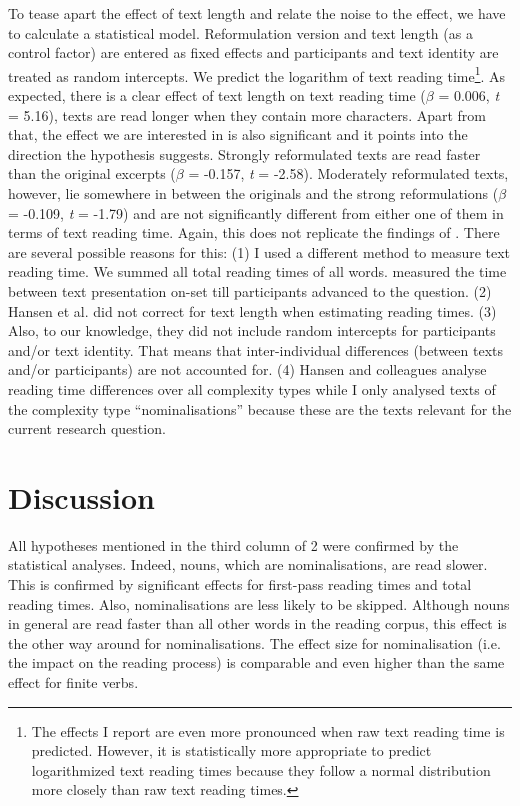 \documentclass[output=paper]{langsci/langscibook}
\begin{document}
To tease apart the effect of text length and relate the noise to the effect, we have to calculate a statistical model. Reformulation version and text length (as a control factor) are entered as fixed effects and participants and text identity are treated as random intercepts. We predict the logarithm of text reading time\footnote{The effects I report are even more pronounced when raw text reading time is predicted. However, it is statistically more appropriate to predict logarithmized text reading times because they follow a normal distribution more closely than raw text reading times.}. As expected, there is a clear effect of text length on text reading time (\textit{$\beta $} = 0.006, \textit{t} = 5.16), texts are read longer when they contain more characters. Apart from that, the effect we are interested in is also significant and it points into the direction the hypothesis suggests. Strongly reformulated texts are read faster than the original excerpts (\textit{$\beta $} = -0.157, \textit{t} = -2.58). Moderately reformulated texts, however, lie somewhere in between the originals and the strong reformulations (\textit{$\beta $} = -0.109, \textit{t} = -1.79) and are not significantly different from either one of them in terms of text reading time. Again, this does not replicate the findings of \citet{HansenEtAl2006}. There are several possible reasons for this: (1) I used a different method to measure text reading time. We summed all total reading times of all words. \citet{HansenEtAl2006} measured the time between text presentation on-set till participants advanced to the question. (2) Hansen et al. did not correct for text length when estimating reading times. (3) Also, to our knowledge, they did not include random intercepts for participants and/or text identity. That means that inter-individual differences (between texts and/or participants) are not accounted for.\label{bkm:Ref283726149} (4) Hansen and colleagues analyse reading time differences over all complexity types while I only analysed texts of the complexity type “nominalisations” because these are the texts relevant for the current research question. 

\section{Discussion}

All hypotheses mentioned in the third column of 2 were confirmed by the statistical analyses. Indeed, nouns, which are nominalisations, are read slower. This is confirmed by significant effects for first-pass reading times and total reading times. Also, nominalisations are less likely to be skipped. Although nouns in general are read faster than all other words in the reading corpus, this effect is the other way around for nominalisations. The effect size for nominalisation (i.e. the impact on the reading process) is comparable and even higher than the same effect for finite verbs.
\end{document}
